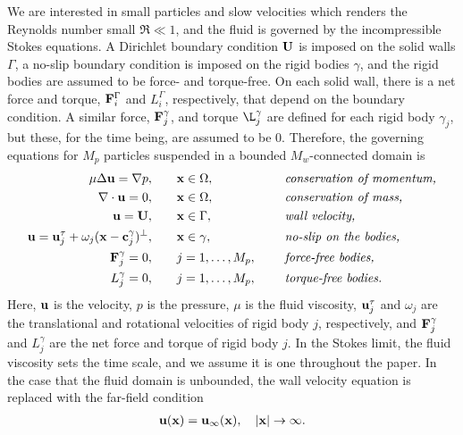 \documentclass[preprint, 10pt]{elsarticle}
\begin{document}
We are interested in small particles and slow velocities which renders
the Reynolds number small $\Re \ll 1$, and the fluid is governed by the
incompressible Stokes equations.  A Dirichlet boundary condition ${\mathbf{U}}$
is imposed on the solid walls $\Gamma$, a no-slip boundary condition is
imposed on the rigid bodies $\gamma$, and the rigid bodies are assumed
to be force- and torque-free.  On each solid wall, there is a net force
and torque, ${\mathbf{F}}^\Gamma_i$ and $L^\Gamma_i$, respectively, that depend
on the boundary condition.  A similar force, ${\mathbf{F}}^\gamma_j$, and torque
$\L^\gamma_j$ are defined for each rigid body $\gamma_j$, but these, for
the time being, are assumed to be 0.  Therefore, the governing equations
for $M_p$ particles suspended in a bounded $M_w$-connected domain is
\begin{equation}
  \label{eqn:modelEquations}
  \begin{split}
  \mu \Delta {\mathbf{u}} = {\nabla} p, &\hspace{20pt} {\mathbf{x}} \in \Omega, \hspace*{.2in}
    &&\mbox{\em conservation of momentum,}\\
  {\nabla} \cdot {\mathbf{u}} = 0, &\hspace{20pt} {\mathbf{x}} \in \Omega, \hspace*{.2in}
    &&\mbox{\em conservation of mass,} \\
  {\mathbf{u}} = {\mathbf{U}}, &\hspace{20pt} {\mathbf{x}} \in \Gamma, \hspace*{.2in} 
    &&\mbox{\em wall velocity,} \\
  {\mathbf{u}} = {\mathbf{u}}^\tau_j + \omega_j({\mathbf{x}}-{\mathbf{c}}^\gamma_j)^\perp,&\hspace{20pt} 
    {\mathbf{x}} \in \gamma, \hspace*{.2in} &&\mbox{\em no-slip on the bodies,} \\
  {\mathbf{F}}_j^\gamma = 0, &\hspace{20pt}j=1,\ldots,M_p, \hspace*{.2in} 
    &&\mbox{\em force-free bodies,} \\
  L_j^\gamma = 0, &\hspace{20pt}j=1,\ldots,M_p, \hspace*{.2in} 
    &&\mbox{\em torque-free bodies.}
  \end{split}
\end{equation}
Here, ${\mathbf{u}}$ is the velocity, $p$ is the pressure, $\mu$ is the fluid
viscosity, ${\mathbf{u}}^\tau_j$ and $\omega_j$ are the translational and
rotational velocities of rigid body $j$, respectively, and
${\mathbf{F}}_j^\gamma$ and $L_j^\gamma$ are the net force and torque of rigid
body $j$.  In the Stokes limit, the fluid viscosity sets
the time scale, and we assume it is one throughout the paper.  In the
case that the fluid domain is unbounded, the wall velocity equation is
replaced with the far-field condition
\begin{align*}
  {\mathbf{u}}({\mathbf{x}}) = {\mathbf{u}}_\infty({\mathbf{x}}), \quad |{\mathbf{x}}| \rightarrow \infty.
\end{align*}
\end{document}
